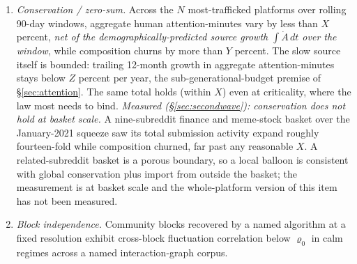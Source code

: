 \documentclass[11pt]{article}
\begin{document}
\begin{enumerate}[label=(\roman*),itemsep=2pt]
\item \emph{Conservation / zero-sum.} Across the $N$ most-trafficked platforms over rolling 90-day windows, aggregate human attention-minutes vary by less than $X$ percent, \emph{net of the demographically-predicted source growth $\int\dot A\,dt$ over the window}, while composition churns by more than $Y$ percent. The slow source itself is bounded: trailing 12-month growth in aggregate attention-minutes stays below $Z$ percent per year, the sub-generational-budget premise of \S\ref{sec:attention}. The same total holds (within $X$) even at criticality, where the law most needs to bind. \emph{Measured (\S\ref{sec:secondwave}): conservation does not hold at basket scale.} A nine-subreddit finance and meme-stock basket over the January-2021 squeeze saw its total submission activity expand roughly fourteen-fold while composition churned, far past any reasonable $X$. A related-subreddit basket is a porous boundary, so a local balloon is consistent with global conservation plus import from outside the basket; the measurement is at basket scale and the whole-platform version of this item has not been measured.
\item \emph{Block independence.} Community blocks recovered by a named algorithm at a fixed resolution exhibit cross-block fluctuation correlation below $\varrho_0$ in calm regimes across a named interaction-graph corpus.

\end{enumerate}
\end{document}
